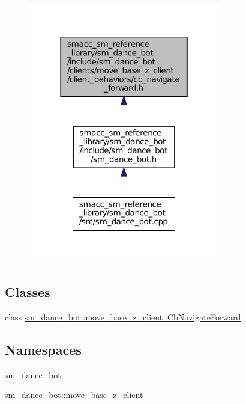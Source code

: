 \begin{figure}[H]
\begin{center}
\leavevmode
\includegraphics[width=238pt]{smacc__sm__reference__library_2sm__dance__bot_2include_2sm__dance__bot_2clients_2move__base__z__85ec967b83ec6a72b1dbd18e7551f5a3}
\end{center}
\end{figure}
\subsection*{Classes}
\begin{DoxyCompactItemize}
\item 
class \hyperlink{classsm__dance__bot_1_1move__base__z__client_1_1CbNavigateForward}{sm\+\_\+dance\+\_\+bot\+::move\+\_\+base\+\_\+z\+\_\+client\+::\+Cb\+Navigate\+Forward}
\end{DoxyCompactItemize}
\subsection*{Namespaces}
\begin{DoxyCompactItemize}
\item 
 \hyperlink{namespacesm__dance__bot}{sm\+\_\+dance\+\_\+bot}
\item 
 \hyperlink{namespacesm__dance__bot_1_1move__base__z__client}{sm\+\_\+dance\+\_\+bot\+::move\+\_\+base\+\_\+z\+\_\+client}
\end{DoxyCompactItemize}
